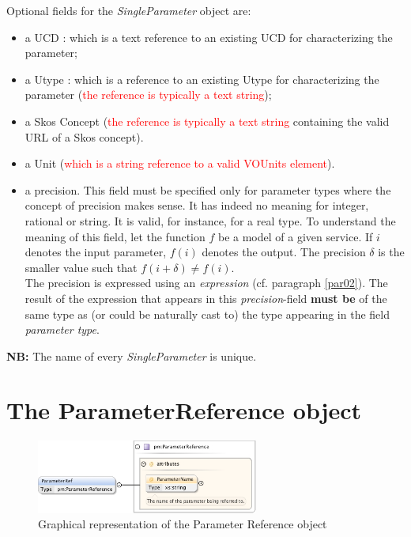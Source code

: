 \documentclass[a4paper,11pt] {ivoa}
\begin{document}
Optional fields for the {\it SingleParameter} object are:
\begin{itemize}
\item a UCD : which is a text reference to an existing UCD for characterizing the parameter;
\item a Utype  : which is a reference to an existing Utype for characterizing the parameter
(\textcolor{red}{the reference is typically a text string});
\item a Skos Concept  (\textcolor{red}{the reference is typically a text string} containing the valid URL of a Skos concept).
\item a Unit (\textcolor{red}{which is a string reference to a valid VOUnits element}).
\item a precision. This field must be specified only for parameter types where the concept of
precision makes sense. It has indeed no meaning for integer, rational or string. It is valid, for instance, for a real type. To understand the meaning of this field, let the function
$f$ be a model of a given service. If $i$ denotes the input parameter, $f(i)$ denotes the output. The
precision $\delta$ is the smaller value such that $f(i+\delta) \neq f(i)$.\\ The precision is
expressed using an {\it expression} (cf. paragraph \ref{par02}). The result of the expression that
appears in this {\it precision}-field  {\bf must be} of the same type as (or could be naturally
cast to) the type appearing in the field {\it parameter type}.
\end{itemize}

{\bf NB:} The name of every {\it SingleParameter} is unique. 

\section{The ParameterReference object}\label{par-parRef}

\begin{figure}[htbp]
\begin{center}
\includegraphics[width=0.65\textwidth]{pictures/ParameterRef.jpg} 
\caption{Graphical representation of the Parameter Reference object}
\label{Pic-ParameterRef}
\end{center}
\end{figure}
\end{document}
